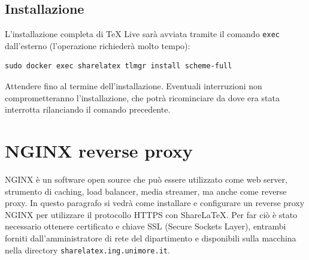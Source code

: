\subsection{Installazione}
L'installazione completa di TeX Live sarà avviata tramite il comando \verb|exec| dall'esterno (l'operazione richiederà molto tempo):
\begin{lstlisting}
sudo docker exec sharelatex tlmgr install scheme-full
\end{lstlisting}
Attendere fino al termine dell'installazione. Eventuali interruzioni non comprometteranno l'installazione, che potrà ricominciare da dove era stata interrotta rilanciando il comando precedente.

\section{NGINX reverse proxy}
NGINX \cite{nginx} è un software open source che può essere utilizzato come web server, strumento di caching, load balancer, media streamer, ma anche come reverse proxy. In questo paragrafo si vedrà come installare e configurare un reverse proxy NGINX per utilizzare il protocollo HTTPS con ShareLaTeX. Per far ciò è stato necessario ottenere certificato e chiave SSL (Secure Sockets Layer), entrambi forniti dall'amministratore di rete del dipartimento e disponibili sulla macchina nella directory \verb|sharelatex.ing.unimore.it|.

